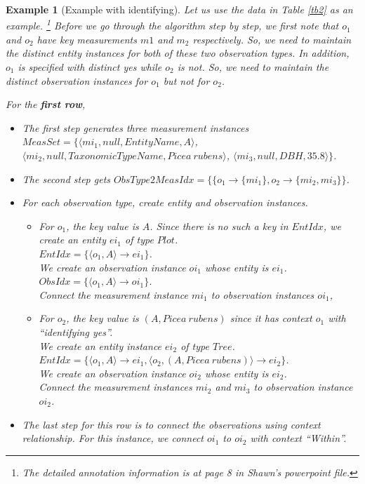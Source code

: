 \documentclass[10pt]{article}
\newtheorem{example}{Example}[section]
\begin{document}
\begin{example} [Example with identifying]\label{eg2}
Let us use the data in Table \ref{tb2} as an example. \footnote{The detailed annotation information is at page 8 in Shawn's powerpoint file.}
Before we go through the algorithm step by step,  we first note that  $o_1$ and $o_2$ have key measurements $m1$ and $m_2$ respectively. 
So, we need to maintain the distinct entity instances for both of these two observation types. 
In addition, $o_1$ is specified with {\em distinct yes} while $o_2$ is not. So, we need to maintain the distinct observation instances for $o_1$ but not for $o_2$. 

For the {\bf first row}, 
\begin{itemize}
\item The first step generates three measurement instances $MeasSet=\{\langle mi_1, null, EntityName, A\rangle$, \\
$\langle mi_2, null, TaxonomicTypeName, Picea~rubens\rangle$, $\langle mi_3, null, DBH, 35.8\rangle\}$.
\item The second step gets $ObsType2MeasIdx = \{\{o_1\rightarrow \{mi_1\}, o_2 \rightarrow \{mi_2, mi_3\}\}$.
\item For each observation type, create entity and observation instances.
\begin{itemize}
\item For $o_1$, the key value is $A$. Since there is no such a key in $EntIdx$, we create an entity $ei_1$ of type $Plot$.\\
	$EntIdx = \{\langle o_1, A\rangle \rightarrow ei_1\}$. \\
	We create an observation instance $oi_1$ whose entity is $ei_1$.\\
	$ObsIdx = \{\langle o_1, A\rangle \rightarrow oi_1\}$.\\
	Connect the measurement instance $mi_1$ to observation instances  $oi_1$,
\item For $o_2$, 
	the key value is $(A, Picea~rubens)$ since it has context $o_1$ with ``{\em identifying yes}''.\\
  	We create an entity instance $ei_2$ of type $Tree$. \\
	$EntIdx = \{\langle o_1, A\rangle \rightarrow ei_1, \langle o_2, (A, Picea~rubens) \rangle \rightarrow ei_2\}$.\\
	We  create an observation instance $oi_2$ whose entity is $ei_2$.\\
	Connect the measurement instances $mi_2$ and $mi_3$  to observation instance $oi_2$.
\end{itemize}
\item The last step for this row is to connect the observations using context relationship. For this instance, we connect $oi_1$ to $oi_2$ with context ``{\em Within}''.
\end{itemize}


\end{example}
\end{document}
